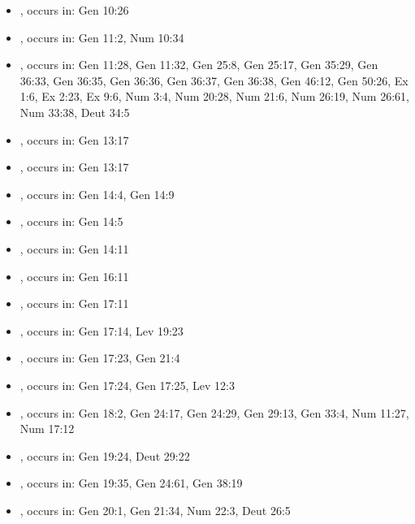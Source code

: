 \documentclass[14pt]{article}
\begin{document}
\begin{itemize}
\item {}, occurs in: Gen 10:26

\item {}, occurs in: Gen 11:2, Num 10:34

\item {}, occurs in: Gen 11:28, Gen 11:32, Gen 25:8, Gen 25:17, Gen 35:29, Gen 36:33, Gen 36:35, Gen 36:36, Gen 36:37, Gen 36:38, Gen 46:12, Gen 50:26, Ex 1:6, Ex 2:23, Ex 9:6, Num 3:4, Num 20:28, Num 21:6, Num 26:19, Num 26:61, Num 33:38, Deut 34:5

\item {}, occurs in: Gen 13:17

\item {}, occurs in: Gen 13:17

\item {}, occurs in: Gen 14:4, Gen 14:9

\item {}, occurs in: Gen 14:5

\item {}, occurs in: Gen 14:11

\item {}, occurs in: Gen 16:11

\item {}, occurs in: Gen 17:11

\item {}, occurs in: Gen 17:14, Lev 19:23

\item {}, occurs in: Gen 17:23, Gen 21:4

\item {}, occurs in: Gen 17:24, Gen 17:25, Lev 12:3

\item {}, occurs in: Gen 18:2, Gen 24:17, Gen 24:29, Gen 29:13, Gen 33:4, Num 11:27, Num 17:12

\item {}, occurs in: Gen 19:24, Deut 29:22

\item {}, occurs in: Gen 19:35, Gen 24:61, Gen 38:19

\item {}, occurs in: Gen 20:1, Gen 21:34, Num 22:3, Deut 26:5


\end{itemize}
\end{document}
